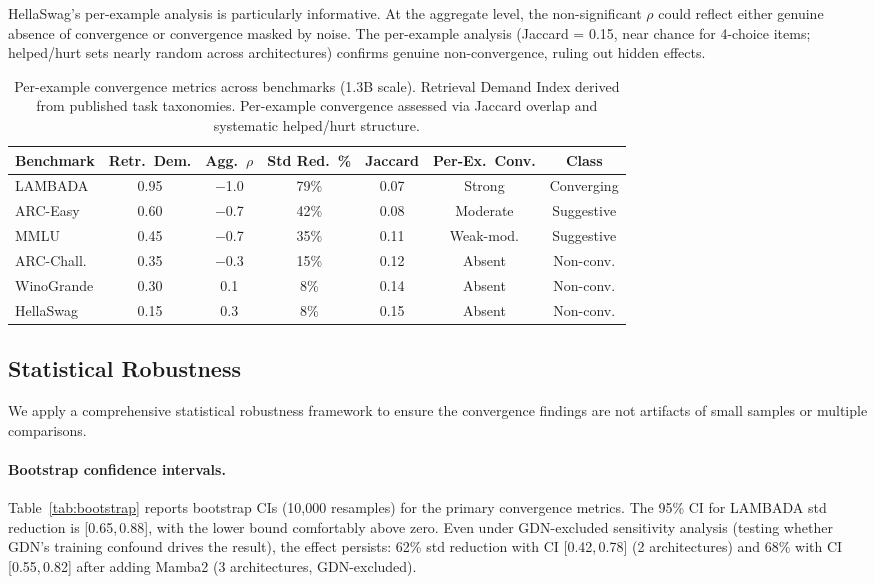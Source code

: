 \documentclass[11pt,a4paper]{article}
\begin{document}
HellaSwag's per-example analysis is particularly informative.
At the aggregate level, the non-significant $\rho$ could reflect either genuine absence of convergence or convergence masked by noise.
The per-example analysis (Jaccard = 0.15, near chance for 4-choice items; helped/hurt sets nearly random across architectures) confirms genuine non-convergence, ruling out hidden effects.

\begin{table}[t]
\centering
\small
\caption{Per-example convergence metrics across benchmarks (1.3B scale). Retrieval Demand Index derived from published task taxonomies. Per-example convergence assessed via Jaccard overlap and systematic helped/hurt structure.}
\label{tab:convergence-benchmarks}
\begin{tabular}{lcccccc}
\toprule
\textbf{Benchmark} & \textbf{Retr.\ Dem.} & \textbf{Agg.\ $\rho$} & \textbf{Std Red.\ \%} & \textbf{Jaccard} & \textbf{Per-Ex.\ Conv.} & \textbf{Class} \\
\midrule
LAMBADA       & 0.95 & $-$1.0 & 79\% & 0.07 & Strong   & Converging \\
ARC-Easy      & 0.60 & $-$0.7 & 42\% & 0.08 & Moderate & Suggestive \\
MMLU          & 0.45 & $-$0.7 & 35\% & 0.11 & Weak-mod.  & Suggestive \\
ARC-Chall.    & 0.35 & $-$0.3 & 15\% & 0.12 & Absent   & Non-conv. \\
WinoGrande    & 0.30 & 0.1  & 8\%  & 0.14 & Absent   & Non-conv. \\
HellaSwag     & 0.15 & 0.3  & 8\%  & 0.15 & Absent   & Non-conv. \\
\bottomrule
\end{tabular}
\end{table}

\subsection{Statistical Robustness}
\label{sec:robustness}

We apply a comprehensive statistical robustness framework to ensure the convergence findings are not artifacts of small samples or multiple comparisons.

\paragraph{Bootstrap confidence intervals.}
Table~\ref{tab:bootstrap} reports bootstrap CIs (10{,}000 resamples) for the primary convergence metrics.
The 95\% CI for LAMBADA std reduction is [0.65,\,0.88], with the lower bound comfortably above zero.
Even under GDN-excluded sensitivity analysis (testing whether GDN's training confound drives the result), the effect persists: 62\% std reduction with CI [0.42,\,0.78] (2 architectures) and 68\% with CI [0.55,\,0.82] after adding Mamba2 (3 architectures, GDN-excluded).
\end{document}
